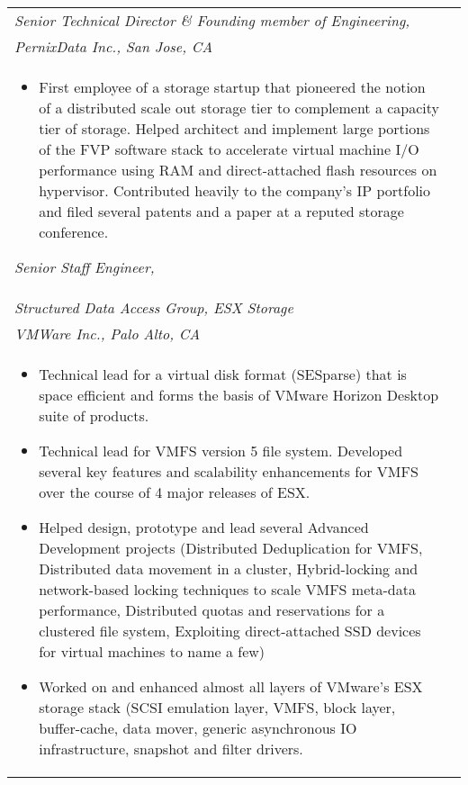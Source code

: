 \documentclass{article}
\begin{document}
  \begin{center}
         \normalsize
	\begin{tabularx}{6.2in}{Xr}
           \emph{Senior Technical Director \& Founding member of Engineering, } \\
	\emph{PernixData Inc., San Jose, CA} & \\
	\begin{itemize}
	\small
     \item {First employee of a storage startup that pioneered the notion of a
           distributed scale out storage tier to complement a capacity tier of
           storage. Helped architect and implement
           large portions of the FVP software stack to accelerate virtual
           machine I/O performance using RAM and direct-attached flash
        resources on hypervisor. Contributed heavily to the company's IP
     portfolio and filed several patents and a paper at a reputed storage
  conference.}
	\end{itemize}
	\normalsize

	\emph{Senior Staff Engineer, } \\
	\emph{Structured Data Access Group, ESX Storage} & \\
	\emph{VMWare Inc., Palo Alto, CA} & \\
	\begin{itemize}
	\small
        \item  {Technical lead for a virtual disk format (SESparse) that is
              space efficient and forms the basis of VMware Horizon Desktop
           suite of products.}
	\item {Technical lead for VMFS version 5 file system. Developed
               several key features and scalability enhancements for VMFS over the
               course of 4 major releases of ESX.}
        \item {Helped design, prototype and lead several Advanced Development
               projects (Distributed Deduplication for VMFS, Distributed data
               movement in a cluster, Hybrid-locking and network-based locking techniques to scale VMFS
               meta-data performance, Distributed quotas and reservations for a
               clustered file system, Exploiting direct-attached SSD devices
               for virtual machines to name a few)}
        \item {Worked on and enhanced almost all layers of VMware's ESX storage stack (SCSI emulation layer,
               VMFS, block layer, buffer-cache, data mover, generic asynchronous IO
               infrastructure, snapshot and filter drivers.}
	\end{itemize}
	\end{tabularx}


\end{center}
\end{document}
